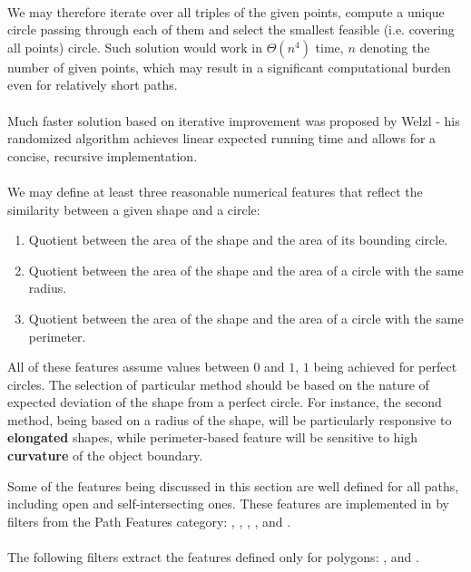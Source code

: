 \paragraph*{}
We may therefore iterate over all triples of the given points, compute a unique circle passing through each of them and select the smallest feasible (i.e. covering all points) circle. Such solution would work in $\Theta(n^4)$ time, $n$ denoting the number of given points, which may result in a significant computational burden even for relatively short paths.

\paragraph*{}
Much faster solution based on iterative improvement was proposed\cite{Welzl91} by Welzl - his randomized algorithm achieves linear expected running time and allows for a concise, recursive implementation.

\paragraph*{}
We may define at least three reasonable numerical features that reflect the similarity between a given shape and a circle:
\begin{enumerate}
	\item Quotient between the area of the shape and the area of its bounding circle.
	\item Quotient between the area of the shape and the area of a circle with the same radius.
	\item Quotient between the area of the shape and the area of a circle with the same perimeter.
\end{enumerate}
All of these features assume values between $0$ and $1$, $1$ being achieved for perfect circles. The selection of particular method should be based on the nature of expected deviation of the shape from a perfect circle. For instance, the second method, being based on a radius of the shape, will be particularly responsive to \textbf{elongated} shapes, while perimeter-based feature will be sensitive to high \textbf{curvature} of the object boundary.

\begin{refImpl}
Some of the features being discussed in this section are well defined for all paths, including open and self-intersecting ones. These features are implemented in \studio by filters from the Path Features category:
,
, 
, 
,
 and
.

\paragraph*{}
The following \studio filters extract the features defined only for polygons: 
, 
 and 
.
\end{refImpl}